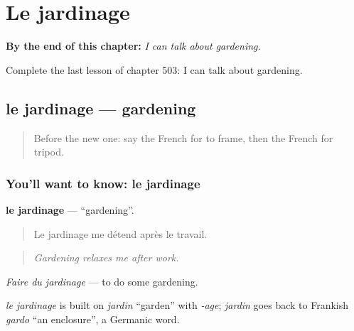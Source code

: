 
\chapter{Le jardinage}
\label{ch:fr-le-jardinage}

\begin{chapteropening}
\textbf{By the end of this chapter:} \emph{I can talk about gardening.}

Complete the last lesson of chapter 503: I can talk about gardening.
\end{chapteropening}

\section[le jardinage]{le jardinage — gardening}

\label{lesson:FR-C503-jardinage}



\begin{quote}
Before the new one: say the French for to frame, then the French for tripod.
\end{quote}

\subsection*{You'll want to know: le jardinage}
\textbf{le jardinage} — \textquotedblleft{}gardening\textquotedblright{}.

\begin{quote}
Le jardinage me détend après le travail.
\end{quote}

\begin{quote}
\emph{Gardening relaxes me after work.}
\end{quote}

\emph{Faire du jardinage} — to do some gardening.

\begin{cousinweb}
\emph{le jardinage} is built on \emph{jardin} \textquotedblleft{}garden\textquotedblright{} with \emph{-age}; \emph{jardin} goes back to Frankish \emph{gardo} \textquotedblleft{}an enclosure\textquotedblright{}, a Germanic word.
\end{cousinweb}

